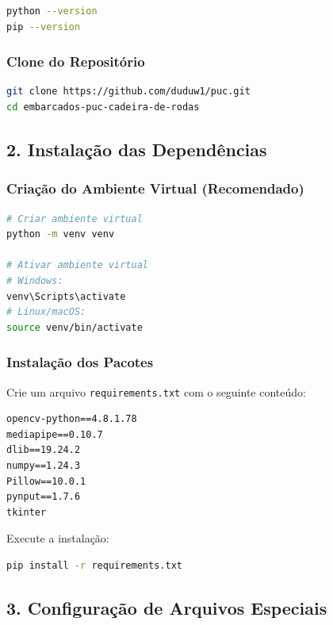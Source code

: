 \documentclass[12pt,a4paper]{article}
\begin{document}
\begin{lstlisting}[language=bash]
python --version
pip --version
\end{lstlisting}

\subsubsection{Clone do Repositório}

\begin{lstlisting}[language=bash]
git clone https://github.com/duduw1/puc.git
cd embarcados-puc-cadeira-de-rodas
\end{lstlisting}

\subsection{2. Instalação das Dependências}

\subsubsection{Criação do Ambiente Virtual (Recomendado)}

\begin{lstlisting}[language=bash]
# Criar ambiente virtual
python -m venv venv

# Ativar ambiente virtual
# Windows:
venv\Scripts\activate
# Linux/macOS:
source venv/bin/activate
\end{lstlisting}

\subsubsection{Instalação dos Pacotes}

Crie um arquivo \texttt{requirements.txt} com o seguinte conteúdo:

\begin{lstlisting}
opencv-python==4.8.1.78
mediapipe==0.10.7
dlib==19.24.2
numpy==1.24.3
Pillow==10.0.1
pynput==1.7.6
tkinter
\end{lstlisting}

Execute a instalação:

\begin{lstlisting}[language=bash]
pip install -r requirements.txt
\end{lstlisting}

\subsection{3. Configuração de Arquivos Especiais}
\end{document}
